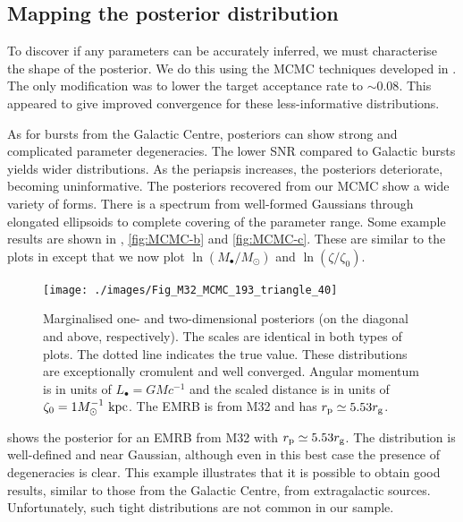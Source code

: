\subsection{Mapping the posterior distribution}

To discover if any parameters can be accurately inferred, we must characterise the shape of the posterior. We do this using the MCMC techniques developed in . The only modification was to lower the target acceptance rate to $\sim0.08$. This appeared to give improved convergence for these less-informative distributions.

As for bursts from the Galactic Centre, posteriors can show strong and complicated parameter degeneracies. The lower SNR compared to Galactic bursts yields wider distributions. As the periapsis increases, the posteriors deteriorate, becoming uninformative. The posteriors recovered from our MCMC show a wide variety of forms. There is a spectrum from well-formed Gaussians through elongated ellipsoids to complete covering of the parameter range. Some example results are shown in , \ref{fig:MCMC-b} and \ref{fig:MCMC-c}. These are similar to the plots in  except that we now plot $\ln(M_\bullet/M_\odot)$ and $\ln(\zeta/\zeta_0)$.

\begin{figure}
\centering
\vspace{0.5\baselineskip}
   \texttt{[image: ./images/Fig\_M32\_MCMC\_193\_triangle\_40]}
\caption{Marginalised one- and two-dimensional posteriors (on the diagonal and above, respectively). The scales are identical in both types of plots. The dotted line indicates the true value. These distributions are exceptionally cromulent and well converged. Angular momentum is in units of $L_\bullet = GM c^{-1}$ and the scaled distance is in units of $\zeta_0 = 1 M_\odot^{-1}~\mathrm{kpc}$. The EMRB is from M32 and has $r_\mathrm{p} \simeq 5.53 r_\mathrm{g}$.}
\label{fig:MCMC-a}
\end{figure}
 shows the posterior for an EMRB from M32 with $r_\mathrm{p} \simeq 5.53 r_\mathrm{g}$. The distribution is well-defined and near Gaussian, although even in this best case the presence of degeneracies is clear. This example illustrates that it is possible to obtain good results, similar to those from the Galactic Centre, from extragalactic sources. Unfortunately, such tight distributions are not common in our sample.

